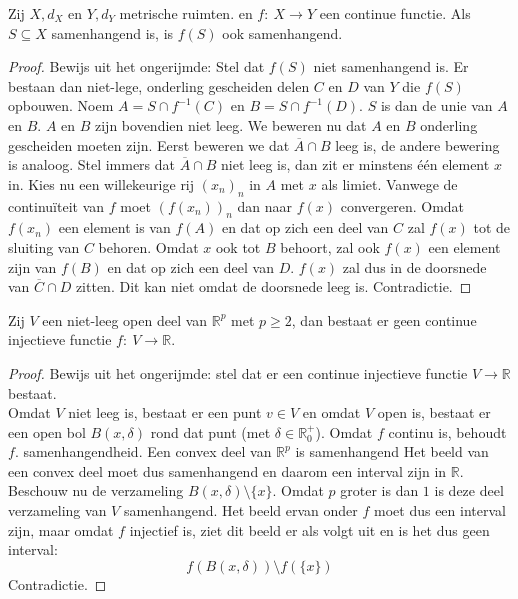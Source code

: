 \documentclass[main.tex]{subfiles}
\begin{document}
\begin{bst}
  \label{st:continue-functie-behoudt-samenhangendheid}
  Zij $X,d_{X}$ en $Y,d_{Y}$ metrische ruimten. en $f:\ X \rightarrow Y$ een continue functie.
  Als $S \subseteq X$ samenhangend is, is $f(S)$ ook samenhangend.

  \begin{proof}
    Bewijs uit het ongerijmde: Stel dat $f(S)$ niet samenhangend is.
    Er bestaan dan niet-lege, onderling gescheiden delen $C$ en $D$ van $Y$ die $f(S)$ opbouwen.
    Noem $A = S \cap f^{-1}(C)$ en $B= S \cap f^{-1}(D)$.
    $S$ is dan de unie van $A$ en $B$.
    $A$ en $B$ zijn bovendien niet leeg.
    We beweren nu dat $A$ en $B$ onderling gescheiden moeten zijn.
    Eerst beweren we dat $\overline{A} \cap B$ leeg is, de andere bewering is analoog.
    Stel immers dat $\overline{A} \cap B$ niet leeg is, dan zit er minstens \'e\'en element $x$ in.
    Kies nu een willekeurige rij $(x_{n})_{n}$ in $A$ met $x$ als limiet.
    Vanwege de continu\"iteit van $f$ moet $(f(x_{n}))_{n}$ dan naar $f(x)$ convergeren.
    Omdat $f(x_{n})$ een element is van $f(A)$ en dat op zich een deel van $C$ zal $f(x)$ tot de sluiting van $C$ behoren.
    Omdat $x$ ook tot $B$ behoort, zal ook $f(x)$ een element zijn van $f(B)$ en dat op zich een deel van $D$.
    $f(x)$ zal dus in de doorsnede van $\overline{C} \cap D$ zitten.
    Dit kan niet omdat de doorsnede leeg is.
    Contradictie.
  \end{proof}
\end{bst}

\begin{st}
  Zij $V$ een niet-leeg open deel van $\mathbb{R}^{p}$ met $p \ge 2$, dan bestaat er geen continue injectieve functie $f:\ V \rightarrow \mathbb{R}$.

  \begin{proof}
    Bewijs uit het ongerijmde: stel dat er een continue injectieve functie $V \rightarrow \mathbb{R}$ bestaat.\\
    Omdat $V$ niet leeg is, bestaat er een punt $v\in V$ en omdat $V$ open is, bestaat er een open bol $B(x,\delta)$ rond dat punt (met $\delta\in\mathbb{R}_{0}^{+}$).
    Omdat $f$ continu is, behoudt $f$. samenhangendheid.
    Een convex deel van $\mathbb{R}^{p}$ is samenhangend
    Het beeld van een convex deel moet dus samenhangend en daarom een interval zijn in $\mathbb{R}$.
    Beschouw nu de verzameling $B(x,\delta) \setminus \{x\}$.
    Omdat $p$ groter is dan $1$ is deze deel verzameling van $V$ samenhangend.
    Het beeld ervan onder $f$ moet dus een interval zijn, maar omdat $f$ injectief is, ziet dit beeld er als volgt uit en is het dus geen interval:
    \[ f(B(x,\delta)) \setminus f(\{x\}) \]
    Contradictie.
  \end{proof}
\end{st}
\end{document}
